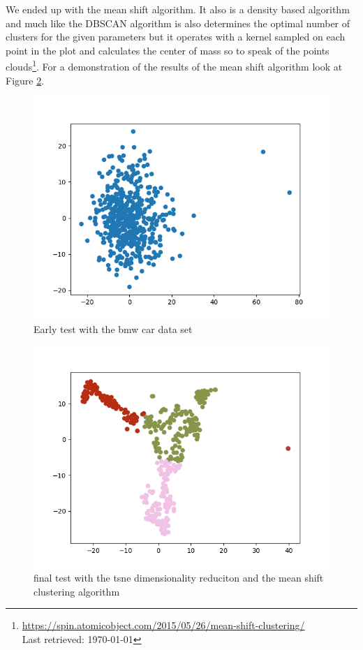 \documentclass[journal]{vgtc}       %
\begin{document}
We ended up with the mean shift algorithm. It also is a density based algorithm and much like the DBSCAN algorithm is also determines the optimal number of clusters for the given parameters but it operates with a kernel sampled on each point in the plot and calculates the center of mass so to speak of the points clouds\footnote{\url{https://spin.atomicobject.com/2015/05/26/mean-shift-clustering/}\\ Last retrieved: \today}. For a demonstration of the results of the mean shift algorithm look at Figure \ref{fig:tsne}. 





\begin{figure}[tb]
	\begin{center}
		\includegraphics[width=.75\linewidth]{Figure2.png}
	\end{center}
	\caption{\label{fig:bmw} Early test with the bmw car data set }
\end{figure}
\begin{figure}[tb]
	\begin{center}
		\includegraphics[width=.75\linewidth]{MS-tsne.png}
	\end{center}
	\caption{\label{fig:tsne} final test with the tsne dimensionality reduciton and the mean shift clustering algorithm }
\end{figure}
\end{document}
